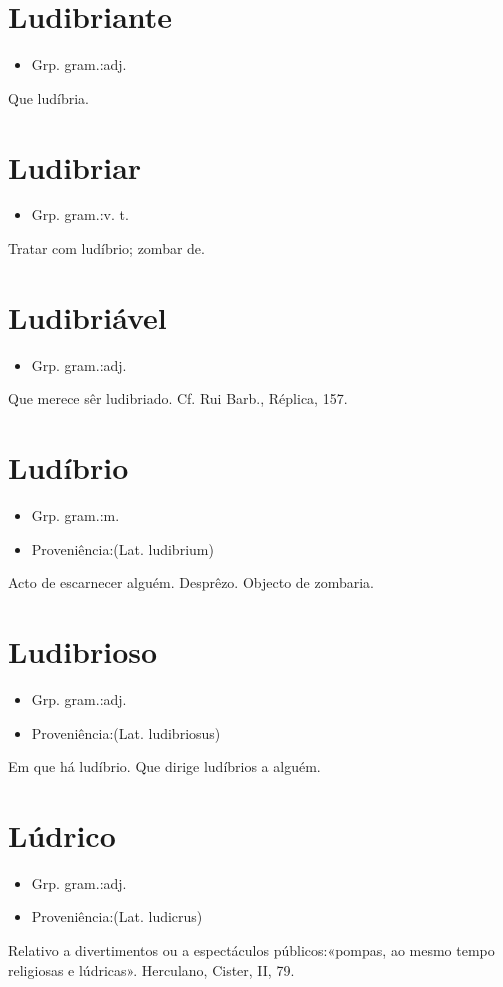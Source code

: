 \section{Ludibriante}
\begin{itemize}
\item {Grp. gram.:adj.}
\end{itemize}
Que ludíbria.
\section{Ludibriar}
\begin{itemize}
\item {Grp. gram.:v. t.}
\end{itemize}
Tratar com ludíbrio; zombar de.
\section{Ludibriável}
\begin{itemize}
\item {Grp. gram.:adj.}
\end{itemize}
Que merece sêr ludibriado. Cf. Rui Barb., \textunderscore Réplica\textunderscore , 157.
\section{Ludíbrio}
\begin{itemize}
\item {Grp. gram.:m.}
\end{itemize}
\begin{itemize}
\item {Proveniência:(Lat. \textunderscore ludibrium\textunderscore )}
\end{itemize}
Acto de escarnecer alguém.
Desprêzo.
Objecto de zombaria.
\section{Ludibrioso}
\begin{itemize}
\item {Grp. gram.:adj.}
\end{itemize}
\begin{itemize}
\item {Proveniência:(Lat. \textunderscore ludibriosus\textunderscore )}
\end{itemize}
Em que há ludíbrio.
Que dirige ludíbrios a alguém.
\section{Lúdrico}
\begin{itemize}
\item {Grp. gram.:adj.}
\end{itemize}
\begin{itemize}
\item {Proveniência:(Lat. \textunderscore ludicrus\textunderscore )}
\end{itemize}
Relativo a divertimentos ou a espectáculos públicos:«\textunderscore pompas, ao mesmo tempo religiosas e lúdricas\textunderscore ». Herculano, \textunderscore Cister\textunderscore , II, 79.
